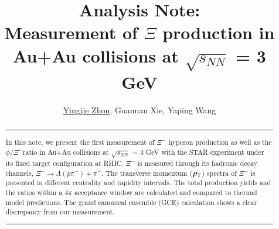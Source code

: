 



\preprint{}

\title{
\Huge{Analysis Note: \\ \textbf{Measurement of $\Xi$ production in Au+Au collisions at $\sqrt{s_{NN}}$ = 3 GeV}}
}
\author{\Large{\underline{Yingjie Zhou}, Guannan Xie, Yaping Wang}}


\begin{abstract}

\noindent\rule[0.25\baselineskip]{\textwidth}{1pt}
In this note, we present the first measurement of $\Xi^-$ hyperon production as well as the $\phi/\Xi^-$ratio in Au+Au collisions at $\sqrt{s_{NN}}$ = 3 GeV with the STAR experiment under its fixed target configuration at RHIC. $\Xi^-$ is measured through its hadronic decay channels, $\Xi^{-}\rightarrow \Lambda(p\pi^-)+\pi^{-}$. The transverse momentum ($p_{\rm T}$) spectra of $\Xi^-$ is presented in different centrality and rapidity intervals. The total production yields and the ratios within a $4\pi$ acceptance window are calculated and compared to thermal model predictions. The grand canonical ensemble (GCE) calculation shows a clear discrepancy from our measurement.
\noindent\rule[0.25\baselineskip]{\textwidth}{1pt}
\end{abstract}

\maketitle
\tableofcontents

\newpage


\linenumbers
\clearpage

%

\clearpage

%

%

%





